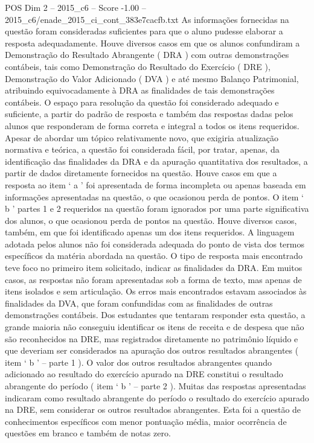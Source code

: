 \begin{textsample}{POS Dim 2 – 2015\_c6 – Score -1.00 – 2015\_c6/enade\_2015\_ci\_cont\_383e7cacfb.txt}
As informações fornecidas na questão foram consideradas suficientes para que o aluno pudesse elaborar a resposta adequadamente.
Houve diversos casos em que os alunos confundiram a Demonstração do Resultado Abrangente ( DRA ) com outras demonstrações contábeis, tais como Demonstração do Resultado do Exercício ( DRE ), Demonstração do Valor Adicionado ( DVA ) e até mesmo Balanço Patrimonial, atribuindo equivocadamente à DRA as finalidades de tais demonstrações contábeis.
O espaço para resolução da questão foi considerado adequado e suficiente, a partir do padrão de resposta e também das respostas dadas pelos alunos que responderam de forma correta e integral a todos os itens requeridos.
Apesar de abordar um tópico relativamente novo, que exigiria atualização normativa e teórica, a questão foi considerada fácil, por tratar, apenas, da identificação das finalidades da DRA e da apuração quantitativa dos resultados, a partir de dados diretamente fornecidos na questão.
Houve casos em que a resposta ao item ‘ a ’ foi apresentada de forma incompleta ou apenas baseada em informações apresentadas na questão, o que ocasionou perda de pontos.
O item ‘ b ’ partes 1 e 2 requeridos na questão foram ignorados por uma parte significativa dos alunos, o que ocasionou perda de pontos na questão.
Houve diversos casos, também, em que foi identificado apenas um dos itens requeridos.
A linguagem adotada pelos alunos não foi considerada adequada do ponto de vista dos termos específicos da matéria abordada na questão.
O tipo de resposta mais encontrado teve foco no primeiro item solicitado, indicar as finalidades da DRA.
Em muitos casos, as respostas não foram apresentadas sob a forma de texto, mas apenas de itens isolados e sem articulação.
Os erros mais encontrados estavam associados às finalidades da DVA, que foram confundidas com as finalidades de outras demonstrações contábeis.
Dos estudantes que tentaram responder esta questão, a grande maioria não conseguiu identificar os itens de receita e de despesa que não são reconhecidos na DRE, mas registrados diretamente no patrimônio líquido e que deveriam ser considerados na apuração dos outros resultados abrangentes ( item ‘ b ’ – parte 1 ).
O valor dos outros resultados abrangentes quando adicionado ao resultado do exercício apurado na DRE constitui o resultado abrangente do período ( item ‘ b ’ – parte 2 ).
Muitas das respostas apresentadas indicaram como resultado abrangente do período o resultado do exercício apurado na DRE, sem considerar os outros resultados abrangentes.
Esta foi a questão de conhecimentos específicos com menor pontuação média, maior ocorrência de questões em branco e também de notas zero.

\end{textsample}
